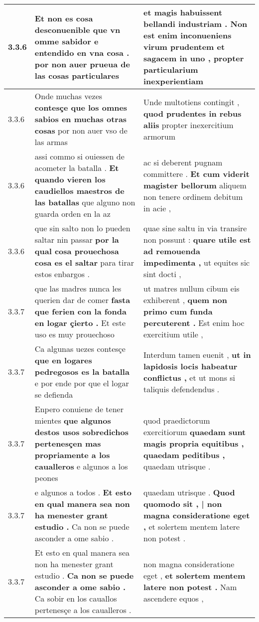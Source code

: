 \begin{tabular}{|p{1cm}|p{6.5cm}|p{6.5cm}|}
3.3.6 & Et non es cosa desconuenible \textbf{ que vn omme sabidor e entendido en vna cosa . } por non auer prueua de las cosas particulares & et magis habuissent bellandi industriam . \textbf{ Non est enim inconueniens virum prudentem et sagacem in uno , } propter particularium inexperientiam \\\hline
3.3.6 & Onde muchas vezes \textbf{ contesçe que los omnes sabios en muchas otras cosas } por non auer vso de las armas & Unde multotiens contingit , \textbf{ quod prudentes in rebus aliis } propter inexercitium armorum \\\hline
3.3.6 & assi commo si ouiessen de acometer la batalla . \textbf{ Et quando vieren los caudiellos maestros de las batallas } que alguno non guarda orden en la az & ac si deberent pugnam committere . \textbf{ Et cum viderit magister bellorum } aliquem non tenere ordinem debitum in acie , \\\hline
3.3.6 & que sin salto non lo pueden saltar nin passar \textbf{ por la qual cosa prouechosa cosa es el saltar } para tirar estos enbargos . & quae sine saltu in via transire non possunt : \textbf{ quare utile est ad remouenda impedimenta , } ut equites sic sint docti , \\\hline
3.3.7 & que las madres nunca les querien dar de comer \textbf{ fasta que ferien con la fonda en logar çierto . } Et este uso es muy prouechoso & ut matres nullum cibum eis exhiberent , \textbf{ quem non primo cum funda percuterent . } Est enim hoc exercitium utile , \\\hline
3.3.7 & Ca algunas uezes contesçe \textbf{ que en logares pedregosos es la batalla } e por ende por que el logar se defienda & Interdum tamen euenit , \textbf{ ut in lapidosis locis habeatur conflictus , } et ut mons si taliquis defendendus . \\\hline
3.3.7 & Enpero conuiene de tener mientes \textbf{ que algunos destos usos sobredichos pertenesçen mas propriamente a los caualleros } e algunos a los peones & quod praedictorum exercitiorum \textbf{ quaedam sunt magis propria equitibus , quaedam peditibus , } quaedam utrisque . \\\hline
3.3.7 & e algunos a todos . \textbf{ Et esto en qual manera sea non ha menester grant estudio . } Ca non se puede asconder a ome sabio . & quaedam utrisque . \textbf{ Quod quomodo sit , | non magna consideratione eget , } et solertem mentem latere non potest . \\\hline
3.3.7 & Et esto en qual manera sea non ha menester grant estudio . \textbf{ Ca non se puede asconder a ome sabio . } Ca sobir en los cauallos pertenesçe a los caualleros . & non magna consideratione eget , \textbf{ et solertem mentem latere non potest . } Nam ascendere equos , \\\hline

\end{tabular}
